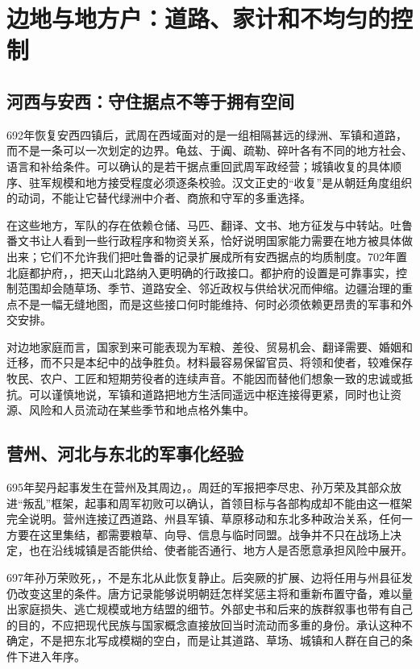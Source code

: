 \section{边地与地方户：道路、家计和不均匀的控制}
\label{sec:wu-zhou-frontier-households}
\subsection{河西与安西：守住据点不等于拥有空间}
692年恢复安西四镇后，武周在西域面对的是一组相隔甚远的绿洲、军镇和道路，而不是一条可以一次划定的边界。龟兹、于阗、疏勒、碎叶各有不同的地方社会、语言和补给条件。可以确认的是若干据点重回武周军政经营；城镇收复的具体顺序、驻军规模和地方接受程度必须逐条校验。汉文正史的“收复”是从朝廷角度组织的动词，不能让它替代绿洲中介者、商旅和守军的多重选择。

在这些地方，军队的存在依赖仓储、马匹、翻译、文书、地方征发与中转站。吐鲁番文书让人看到一些行政程序和物资关系，恰好说明国家能力需要在地方被具体做出来；它们不允许我们把吐鲁番的记录扩展成所有安西据点的均质制度。702年置北庭都护府，，把天山北路纳入更明确的行政接口。都护府的设置是可靠事实，控制范围却会随草场、季节、道路安全、邻近政权与供给状况而伸缩。边疆治理的重点不是一幅无缝地图，而是这些接口何时能维持、何时必须依赖更昂贵的军事和外交安排。

对边地家庭而言，国家到来可能表现为军粮、差役、贸易机会、翻译需要、婚姻和迁移，而不只是本纪中的战争胜负。材料最容易保留官员、将领和使者，较难保存牧民、农户、工匠和短期劳役者的连续声音。不能因而替他们想象一致的忠诚或抵抗。可以谨慎地说，军镇和道路把地方生活同遥远中枢连接得更紧，同时也让资源、风险和人员流动在某些季节和地点格外集中。

\subsection{营州、河北与东北的军事化经验}
695年契丹起事发生在营州及其周边，。周廷的军报把李尽忠、孙万荣及其部众放进“叛乱”框架，起事和周军初败可以确认，首领目标与各部构成却不能由这一框架完全说明。营州连接辽西道路、州县军镇、草原移动和东北多种政治关系，任何一方要在这里集结，都需要粮草、向导、信息与临时同盟。战争并不只在战场上决定，也在沿线城镇是否能供给、使者能否通行、地方人是否愿意承担风险中展开。

697年孙万荣败死，，不是东北从此恢复静止。后突厥的扩展、边将任用与州县征发仍改变这里的条件。唐方记录能够说明朝廷怎样奖惩主将和重新布置守备，难以量出家庭损失、逃亡规模或地方结盟的细节。外部史书和后来的族群叙事也带有自己的目的，不应把现代民族与国家概念直接放回当时流动而多重的身份。承认这种不确定，不是把东北写成模糊的空白，而是让其道路、草场、城镇和人群在自己的条件下进入年序。

